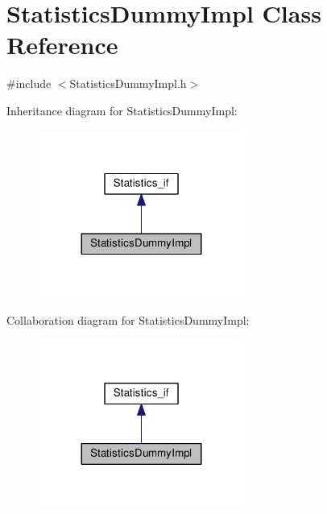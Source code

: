 \hypertarget{class_statistics_dummy_impl}{}\section{Statistics\+Dummy\+Impl Class Reference}
\label{class_statistics_dummy_impl}


{\ttfamily \#include $<$Statistics\+Dummy\+Impl.\+h$>$}



Inheritance diagram for Statistics\+Dummy\+Impl\+:\nopagebreak
\begin{figure}[H]
\begin{center}
\leavevmode
\includegraphics[width=191pt]{class_statistics_dummy_impl__inherit__graph}
\end{center}
\end{figure}


Collaboration diagram for Statistics\+Dummy\+Impl\+:\nopagebreak
\begin{figure}[H]
\begin{center}
\leavevmode
\includegraphics[width=191pt]{class_statistics_dummy_impl__coll__graph}
\end{center}
\end{figure}

